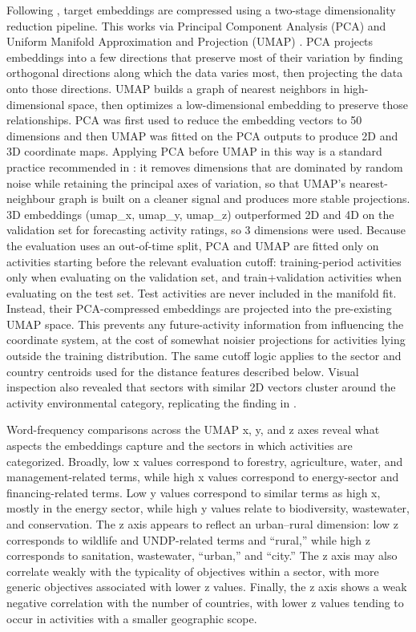 \documentclass[12pt,a4paper]{article}
\let\citep\parencite
\begin{document}
Following \citep{goldembergMindingGapAid2025}, target embeddings are compressed using a two-stage dimensionality reduction pipeline. This works via Principal Component Analysis (PCA) and Uniform Manifold Approximation and Projection (UMAP) \citep{healyUniformManifoldApproximation2024}. PCA projects embeddings into a few directions that preserve most of their variation by finding orthogonal directions along which the data varies most, then projecting the data onto those directions. UMAP builds a graph of nearest neighbors in high-dimensional space, then optimizes a low-dimensional embedding to preserve those relationships. PCA was first used to reduce the embedding vectors to 50 dimensions and then UMAP was fitted on the PCA outputs to produce 2D and 3D coordinate maps. Applying PCA before UMAP in this way is a standard practice recommended in \citep{healyUniformManifoldApproximation2024}: it removes dimensions that are dominated by random noise while retaining the principal axes of variation, so that UMAP's nearest-neighbour graph is built on a cleaner signal and produces more stable projections. 3D embeddings (umap\_x, umap\_y, umap\_z) outperformed 2D and 4D on the validation set for forecasting activity ratings, so 3 dimensions were used. Because the evaluation uses an out-of-time split, PCA and UMAP are fitted only on activities starting before the relevant evaluation cutoff: training-period activities only when evaluating on the validation set, and train+validation activities when evaluating on the test set. Test activities are never included in the manifold fit. Instead, their PCA-compressed embeddings are projected into the pre-existing UMAP space. This prevents any future-activity information from influencing the coordinate system, at the cost of somewhat noisier projections for activities lying outside the training distribution. The same cutoff logic applies to the sector and country centroids used for the distance features described below. Visual inspection also revealed that sectors with similar 2D vectors cluster around the activity environmental category, replicating the finding in \citep{goldembergMindingGapAid2025}.

Word-frequency comparisons across the UMAP x, y, and z axes reveal what aspects the embeddings capture and the sectors in which activities are categorized. Broadly, low x values correspond to forestry, agriculture, water, and management-related terms, while high x values correspond to energy-sector and financing-related terms. Low y values correspond to similar terms as high x, mostly in the energy sector, while high y values relate to biodiversity, wastewater, and conservation. The z axis appears to reflect an urban--rural dimension: low z corresponds to wildlife and UNDP-related terms and ``rural,'' while high z corresponds to sanitation, wastewater, ``urban,'' and ``city.'' The z axis may also correlate weakly with the typicality of objectives within a sector, with more generic objectives associated with lower z values. Finally, the z axis shows a weak negative correlation with the number of countries, with lower z values tending to occur in activities with a smaller geographic scope.
\end{document}
